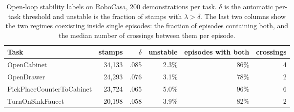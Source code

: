 \begin{table}[t]
\centering
\small
\begin{tabular}{lrrrrr}
\toprule
Task & stamps & $\delta$ & unstable & episodes with both & crossings \\
\midrule
OpenCabinet & 34{,}133 & .085 & 2.3\% & 86\% & 4 \\
OpenDrawer & 24{,}293 & .076 & 3.1\% & 78\% & 2 \\
PickPlaceCounterToCabinet & 23{,}724 & .065 & 5.0\% & 96\% & 6 \\
TurnOnSinkFaucet & 20{,}198 & .058 & 3.9\% & 82\% & 2 \\
\bottomrule
\end{tabular}
\caption{Open-loop stability labels on RoboCasa, 200 demonstrations per task.
$\delta$ is the automatic per-task threshold and unstable is the fraction of
stamps with $\lambda > \delta$. The last two columns show the two regimes
coexisting inside single episodes: the fraction of episodes containing both,
and the median number of crossings between them per episode.}
\label{tab:labels}
\end{table}

